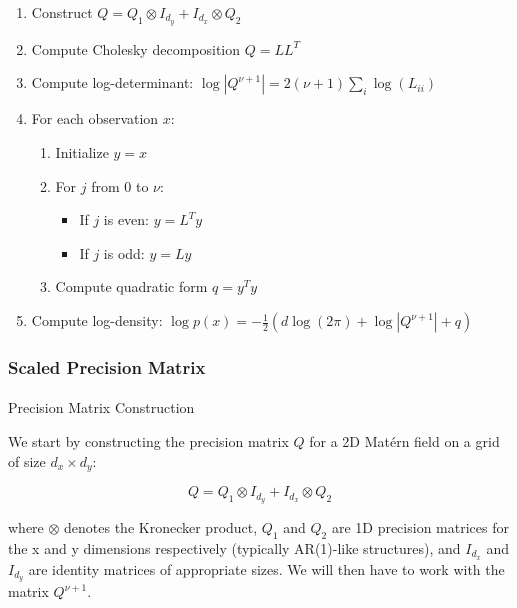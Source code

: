 \documentclass[
  letterpaper,
  DIV=11,
  numbers=noendperiod]{scrartcl}
\makeatletter
\let\oldparagraph\paragraph
\renewcommand{\paragraph}{
    \@ifstar
      \xxxParagraphStar
      \xxxParagraphNoStar
  }
\newcommand{\xxxParagraphStar}[1]{\oldparagraph*{#1}\mbox{}}
\newcommand{\xxxParagraphNoStar}[1]{\oldparagraph{#1}\mbox{}}
\providecommand{\tightlist}{%
  \setlength{\itemsep}{0pt}\setlength{\parskip}{0pt}}\usepackage{longtable,booktabs,array}
\makeatother
\begin{document}
\begin{enumerate}
\def\labelenumi{\arabic{enumi}.}
\tightlist
\item
  Construct \(Q = Q_1 \otimes I_{d_y} + I_{d_x} \otimes Q_2\)
\item
  Compute Cholesky decomposition \(Q = LL^T\)
\item
  Compute log-determinant:
  \(\log|Q^{\nu+1}| = 2(\nu+1)\sum_{i}\log(L_{ii})\)
\item
  For each observation \(x\):

  \begin{enumerate}
  \def\labelenumii{\roman{enumii})}
  \tightlist
  \item
    Initialize \(y = x\)
  \item
    For \(j\) from 0 to \(\nu\):

    \begin{itemize}
    \tightlist
    \item
      If \(j\) is even: \(y = L^T y\)
    \item
      If \(j\) is odd: \(y = L y\)
    \end{itemize}
  \item
    Compute quadratic form \(q = y^Ty\)
  \end{enumerate}
\item
  Compute log-density:
  \(\log p(x) = -\frac{1}{2}(d\log(2\pi) + \log|Q^{\nu+1}| + q)\)
\end{enumerate}

\subsubsection{Scaled Precision Matrix}\label{scaled-precision-matrix}

\paragraph{Precision Matrix
Construction}\label{precision-matrix-construction-1}

We start by constructing the precision matrix \(Q\) for a 2D Matérn
field on a grid of size \(d_x \times d_y\):

\[
Q = Q_1 \otimes I_{d_y} + I_{d_x} \otimes Q_2 
\]

where \(\otimes\) denotes the Kronecker product, \(Q_1\) and \(Q_2\) are
1D precision matrices for the x and y dimensions respectively (typically
AR(1)-like structures), and \(I_{d_x}\) and \(I_{d_y}\) are identity
matrices of appropriate sizes. We will then have to work with the matrix
\(Q^{\nu + 1}\).
\end{document}
